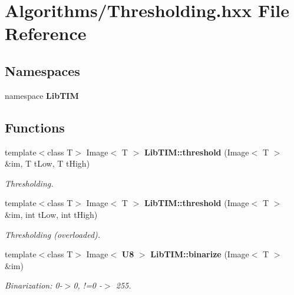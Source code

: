 \section{Algorithms/Thresholding.hxx File Reference}
\label{Thresholding_8hxx}
\subsection*{Namespaces}
\begin{CompactItemize}
\item 
namespace {\bf Lib\-TIM}
\end{CompactItemize}
\subsection*{Functions}
\begin{CompactItemize}
\item 
template$<$class T$>$ Image$<$ T $>$ {\bf Lib\-TIM::threshold} (Image$<$ T $>$ \&im, T t\-Low, T t\-High)
\begin{CompactList}\small\item\em Thresholding. \item\end{CompactList}\item 
template$<$class T$>$ Image$<$ T $>$ {\bf Lib\-TIM::threshold} (Image$<$ T $>$ \&im, int t\-Low, int t\-High)
\begin{CompactList}\small\item\em Thresholding (overloaded). \item\end{CompactList}\item 
template$<$class T$>$ Image$<$ {\bf U8} $>$ {\bf Lib\-TIM::binarize} (Image$<$ T $>$ \&im)
\begin{CompactList}\small\item\em Binarization: 0-$>$0, !=0 -$>$ 255. \item\end{CompactList}\end{CompactItemize}
